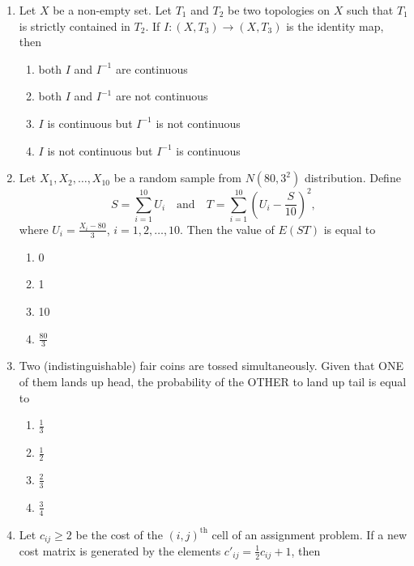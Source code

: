 \documentclass[journal,12pt,onecolumn]{IEEEtran}
\theoremstyle{remark}
\begin{document}
\begin{enumerate}
\item Let $X$ be a non-empty set. Let ${T}_1$ and ${T}_2$ be two topologies on $X$ such that ${T}_1$ is strictly contained in ${T}_2$. If $I:(X, {T}_3) \to (X, {T}_3)$ is the identity map, then
\\[-0.3em]\makebox[\textwidth][r]{\textit{[GATE EE 2025]}}

\begin{enumerate}
\item both $I$ and $I^{-1}$ are continuous
\item both $I$ and $I^{-1}$ are not continuous
\item $I$ is continuous but $I^{-1}$ is not continuous
\item $I$ is not continuous but $I^{-1}$ is continuous
\end{enumerate}


\item Let $X_1, X_2, \dots, X_{10}$ be a random sample from $N(80, 3^2)$ distribution. Define
\[
S = \sum_{i=1}^{10} U_i \quad \text{and} \quad T = \sum_{i=1}^{10} \left( U_i - \frac{S}{10} \right)^2,
\]
where $U_i = \frac{X_i - 80}{3}$, $i=1,2,\dots,10$. Then the value of $E(ST)$ is equal to
\\[-0.3em]\makebox[\textwidth][r]{\textit{[GATE EE 2025]}}

\begin{enumerate}
\item 0
\item 1
\item 10
\item $\frac{80}{3}$
\end{enumerate}

\item Two (indistinguishable) fair coins are tossed simultaneously. Given that ONE of them lands up head, the probability of the OTHER to land up tail is equal to
\\[-0.3em]\makebox[\textwidth][r]{\textit{[GATE EE 2025]}}

\begin{enumerate}
\item $\frac{1}{3}$
\item $\frac{1}{2}$
\item $\frac{2}{3}$
\item $\frac{3}{4}$
\end{enumerate}

\item Let $c_{ij} \ge 2$ be the cost of the $(i,j)^{\text{th}}$ cell of an assignment problem. If a new cost matrix is generated by the elements $c'_{ij} = \frac{1}{2} c_{ij} + 1$, then
\\[-0.3em]\makebox[\textwidth][r]{\textit{[GATE EE 2025]}}


\end{enumerate}
\end{document}
